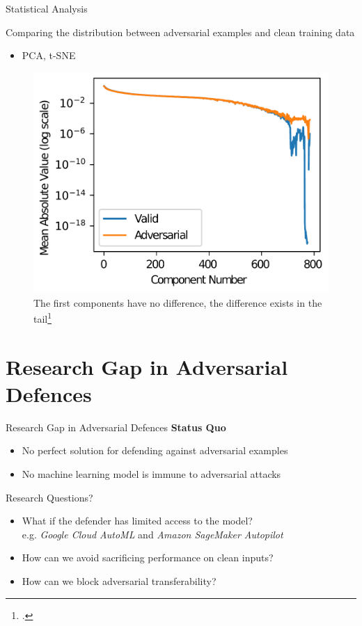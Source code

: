 \documentclass[9pt]{beamer}
\begin{document}
\begin{frame}{Statistical Analysis}
\label{stats}

Comparing the distribution between adversarial examples and clean training data

\begin{examples}
    \begin{itemize}
        \scriptsize
        \item PCA, t-SNE
    \end{itemize}
\end{examples}

\begin{figure}
    \centering
    \small
    \includegraphics[width=0.3\linewidth]{images/pca.png}
    \caption{The first components have no difference, the difference exists in the tail\footcite{carlini2017adversarial}}
\end{figure}

\hyperlink{adv_examples}{}
\end{frame}

\section{Research Gap in Adversarial Defences}

\begin{frame}{Research Gap in Adversarial Defences}
\textbf{Status Quo}\\
\begin{itemize}
    \item No perfect solution for defending against adversarial examples
    \item No machine learning model is immune to adversarial attacks
\end{itemize}

\vspace{1cm}

\begin{block}{Research Questions?}
    \begin{itemize}
        \item What if the defender has limited access to the model?\\e.g. \textit{Google Cloud AutoML} and \textit{Amazon SageMaker Autopilot}
        \item How can we avoid sacrificing performance on clean inputs?
        \item How can we block adversarial transferability?
    \end{itemize}
\end{block}

\end{frame}
\end{document}
